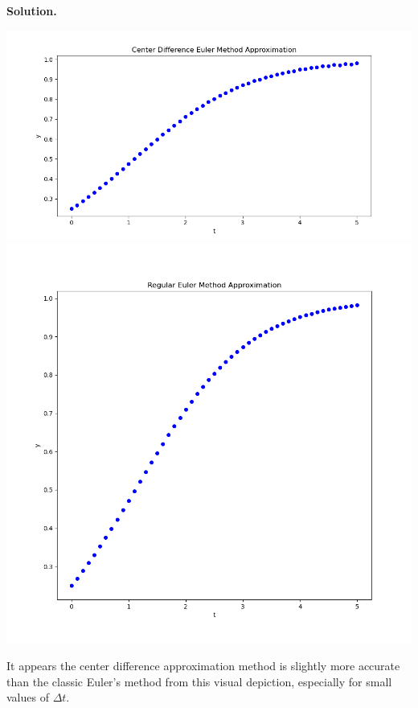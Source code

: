 \documentclass[11pt, letterpaper]{report}
\newenvironment{soln}[1][]{\noindent\textbf{Solution. }}{\hfill\qedsymbol}
\begin{document}
\begin{soln}
\begin{center}
	\end{center}
	\begin{center}
		\includegraphics[scale=0.35]{BigEulerCenter.png}
		\includegraphics[scale=0.35]{BigEuler.png}
	\end{center}
	It appears the center difference approximation method is slightly more accurate than the classic Euler's method from this visual depiction, especially for small values of $\Delta t$.
\end{soln}
\end{document}
